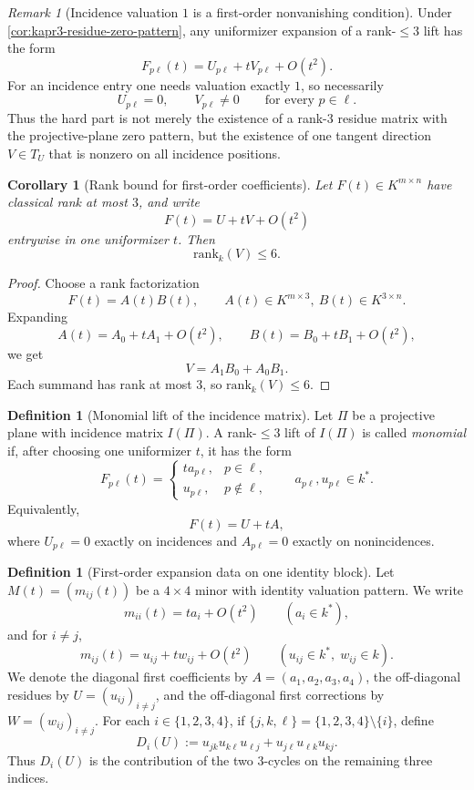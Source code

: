 \documentclass[11pt]{amsart}
\numberwithin{equation}{section}
\theoremstyle{plain}
\newtheorem{corollary}[theorem]{Corollary}
\theoremstyle{definition}
\newtheorem{definition}[theorem]{Definition}
\theoremstyle{remark}
\newtheorem{remark}[theorem]{Remark}
\newcommand{\rank}{\mathrm{rank}}
\begin{document}
\begin{remark}[Incidence valuation $1$ is a first-order nonvanishing condition]
\label{rem:incidence-valuation-one-first-order}
Under \cref{cor:kapr3-residue-zero-pattern}, any uniformizer expansion of a rank-$\le 3$ lift has the form
\[
F_{p\ell}(t)=U_{p\ell}+tV_{p\ell}+O(t^2).
\]
For an incidence entry one needs valuation exactly $1$, so necessarily
\[
U_{p\ell}=0,
\qquad
V_{p\ell}\neq 0
\qquad
\text{for every }p\in\ell.
\tag{4.6}
\]
Thus the hard part is not merely the existence of a rank-$3$ residue matrix with the projective-plane zero pattern, but the existence of one tangent direction $V\in T_U$ that is nonzero on all incidence positions.
\end{remark}

\begin{corollary}[Rank bound for first-order coefficients]
\label{cor:first-order-coefficient-rank-bound}
Let $F(t)\in K^{m\times n}$ have classical rank at most $3$, and write
\[
F(t)=U+tV+O(t^2)
\]
entrywise in one uniformizer $t$.
Then
\[
\rank_k(V)\le 6.
\]
\end{corollary}

\begin{proof}
Choose a rank factorization
\[
F(t)=A(t)B(t),
\qquad
A(t)\in K^{m\times 3},\ B(t)\in K^{3\times n}.
\]
Expanding
\[
A(t)=A_0+tA_1+O(t^2),
\qquad
B(t)=B_0+tB_1+O(t^2),
\]
we get
\[
V=A_1B_0+A_0B_1.
\]
Each summand has rank at most $3$, so $\rank_k(V)\le 6$.
\end{proof}

\begin{definition}[Monomial lift of the incidence matrix]
\label{def:monomial-lift-incidence}
Let $\Pi$ be a projective plane with incidence matrix $I(\Pi)$.
A rank-$\le 3$ lift of $I(\Pi)$ is called \emph{monomial} if, after choosing one uniformizer $t$, it has the form
\[
F_{p\ell}(t)=
\begin{cases}
 t a_{p\ell}, & p\in\ell,\\
 u_{p\ell}, & p\notin\ell,
\end{cases}
\qquad
 a_{p\ell},u_{p\ell}\in k^*.
\]
Equivalently,
\[
F(t)=U+tA,
\]
where $U_{p\ell}=0$ exactly on incidences and $A_{p\ell}=0$ exactly on nonincidences.
\end{definition}

\begin{definition}[First-order expansion data on one identity block]
\label{def:identity4-first-order-expansion}
Let $M(t)=(m_{ij}(t))$ be a $4\times4$ minor with identity valuation pattern.
We write
\[
 m_{ii}(t)=t a_i+O(t^2)
 \qquad (a_i\in k^*),
\]
and for $i\neq j$,
\[
 m_{ij}(t)=u_{ij}+t w_{ij}+O(t^2)
 \qquad (u_{ij}\in k^*,\; w_{ij}\in k).
\]
We denote the diagonal first coefficients by $A=(a_1,a_2,a_3,a_4)$, the off-diagonal residues by $U=(u_{ij})_{i\neq j}$, and the off-diagonal first corrections by $W=(w_{ij})_{i\neq j}$.
For each $i\in\{1,2,3,4\}$, if $\{j,k,\ell\}=\{1,2,3,4\}\setminus\{i\}$, define
\[
D_i(U):=u_{jk}u_{k\ell}u_{\ell j}+u_{j\ell}u_{\ell k}u_{kj}.
\]
Thus $D_i(U)$ is the contribution of the two $3$-cycles on the remaining three indices.
\end{definition}
\end{document}
